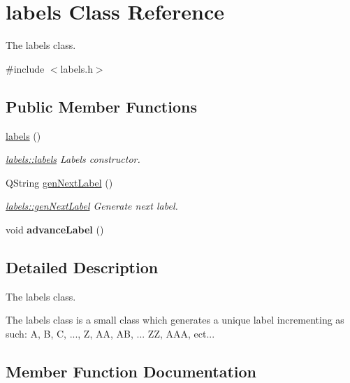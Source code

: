 \hypertarget{classlabels}{}\section{labels Class Reference}
\label{classlabels}


The labels class.  




{\ttfamily \#include $<$labels.\+h$>$}

\subsection*{Public Member Functions}
\begin{DoxyCompactItemize}
\item 
\mbox{\label{classlabels_aabee553ffee5eb33826c90bbda2dbc58}} 
\mbox{\hyperlink{classlabels_aabee553ffee5eb33826c90bbda2dbc58}{labels}} ()
\begin{DoxyCompactList}\small\item\em \mbox{\hyperlink{classlabels_aabee553ffee5eb33826c90bbda2dbc58}{labels\+::labels}} Labels constructor. \end{DoxyCompactList}\item 
Q\+String \mbox{\hyperlink{classlabels_a70a7436dbef91e342fec4ec3130187e2}{gen\+Next\+Label}} ()
\begin{DoxyCompactList}\small\item\em \mbox{\hyperlink{classlabels_a70a7436dbef91e342fec4ec3130187e2}{labels\+::gen\+Next\+Label}} Generate next label. \end{DoxyCompactList}\item 
\mbox{\label{classlabels_a790344f0c86546b9b5fdda30dbe690a5}} 
void {\bfseries advance\+Label} ()
\end{DoxyCompactItemize}


\subsection{Detailed Description}
The labels class. 

The labels class is a small class which generates a unique label incrementing as such\+: A, B, C, ..., Z, AA, AB, ... ZZ, A\+AA, ect... 

\subsection{Member Function Documentation}
\mbox{\label{classlabels_a70a7436dbef91e342fec4ec3130187e2}} 
